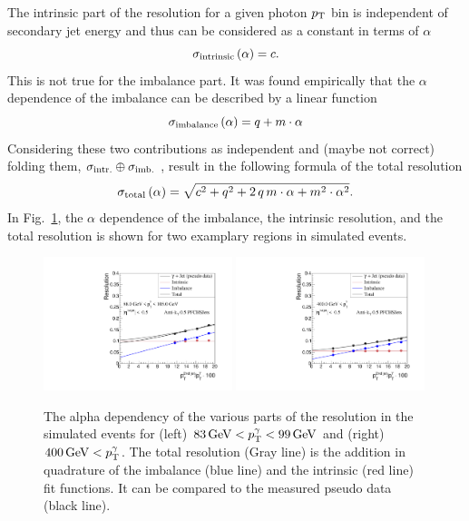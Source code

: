 The intrinsic part of the resolution for a given photon $p_{\text{T}}$ bin is independent of secondary jet energy and thus can be considered as a constant in terms of $\alpha$
\begin{equation}\label{eq:intrinsic}
 \sigma_\mathrm{intrinsic} \left( \alpha\right) = c.
\end{equation}
This is not true for the imbalance part. It was found empirically that the $\alpha$ dependence of the imbalance can be described by a linear function 
\begin{equation}\label{eq:imbalance}
  \sigma_\mathrm{imbalance} \left( \alpha\right) = q + m \cdot \alpha
\end{equation}
Considering these two contributions as independent and \fixme(maybe not correct) folding them,  $\sigma_\mathrm{intr.}\oplus\sigma_\mathrm{imb.}$ , result in the following formula of the total resolution
\begin{equation}\label{eq:total}
  \sigma_\mathrm{total} \left( \alpha \right) = \sqrt{ c^2 + q^2  + 2\, q\, m \cdot \alpha +m^2 \cdot \alpha^2}. 
\end{equation}
In Fig.~\ref{fig:AlphaDependenceOfResolutions}, the $\alpha$ dependence of the imbalance, the intrinsic resolution, and the total resolution is shown for two examplary \ptgamma regions in simulated events. 
\begin{figure}[!b]
 \centering
    \includegraphics[width=0.49\textwidth]{figures/resolution/methodology/JER_for_1_eta_bin_4_pTGamma_bin_all_contributions_PFCHS_RMS99_mc.pdf} 
    \includegraphics[width=0.49\textwidth]{figures/resolution/methodology/JER_for_1_eta_bin_12_pTGamma_bin_all_contributions_PFCHS_RMS99_mc.pdf} 
  \caption{The alpha dependency of the various parts of the resolution in the simulated events for (left) $83 \,\text{Ge}\kern-0.06667em\text{V} < p_{\text{T}}^{\gamma} < 99 \,\text{Ge}\kern-0.06667em\text{V} $ and (right) $400 \,\text{Ge}\kern-0.06667em\text{V} < p_{\text{T}}^{\gamma}$. The total resolution (Gray line) is the addition in quadrature of the imbalance (blue line) and the intrinsic (red line) 
  fit functions. It can 
  be compared to the measured pseudo data (black line).}  
 \label{fig:AlphaDependenceOfResolutions}
\end{figure}
